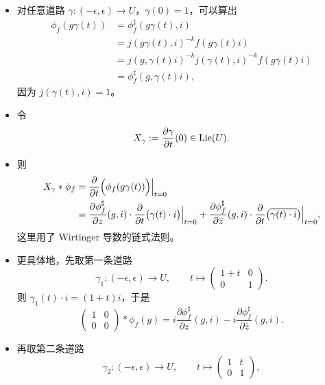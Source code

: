 \begin{itemize}
\item 对任意道路 $\gamma:(-\epsilon,\epsilon)\to U$，$\gamma(0)=1$，可以算出
\begin{align*}
\phi_f(g\gamma(t))
&=\phi_f^\sharp(g\gamma(t),i)\\
&=j(g\gamma(t),i)^{-k}f(g\gamma(t)i)\\
&=j(g,\gamma(t)i)^{-k}j(\gamma(t),i)^{-k}f(g\gamma(t)i)\\
&=\phi_f^\sharp(g,\gamma(t)i),
\end{align*}
因为 $j(\gamma(t),i)=1$。
\item 令
\[
X_\gamma:=\frac{\partial\gamma}{\partial t}(0)\in\operatorname{Lie}(U).
\]
\item 则
\begin{align*}
X_\gamma*\phi_f
&=\frac{\partial}{\partial t}\Bigl(\phi_f(g\gamma(t))\Bigr)\Big|_{t=0}\\
&=\frac{\partial\phi_f^\sharp}{\partial z}(g,i)\cdot\frac{\partial}{\partial t}\bigl(\gamma(t)\cdot i\bigr)\Big|_{t=0}
+\frac{\partial\phi_f^\sharp}{\partial\bar z}(g,i)\cdot\frac{\partial}{\partial t}\bigl(\overline{\gamma(t)\cdot i}\bigr)\Big|_{t=0},
\end{align*}
这里用了 Wirtinger 导数的链式法则。
\item 更具体地，先取第一条道路
\[
\gamma_1:(-\epsilon,\epsilon)\to U,\qquad t\mapsto\begin{pmatrix}1+t&0\\0&1\end{pmatrix}.
\]
则 $\gamma_1(t)\cdot i=(1+t)i$，于是
\[
\begin{pmatrix}1&0\\0&0\end{pmatrix}*\phi_f(g)
=i\frac{\partial\phi_f^\sharp}{\partial z}(g,i)-i\frac{\partial\phi_f^\sharp}{\partial\bar z}(g,i).
\]
\item 再取第二条道路
\[
\gamma_2:(-\epsilon,\epsilon)\to U,\qquad t\mapsto\begin{pmatrix}1&t\\0&1\end{pmatrix},
\]

\end{itemize}
